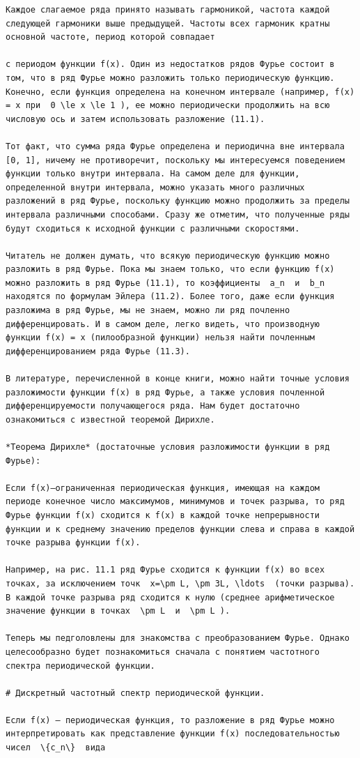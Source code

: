 \documentclass[
  ukrainian,
]{article}
\begin{document}
\begin{verbatim}
Каждое слагаемое ряда принято называть гармоникой, частота каждой следующей гармоники выше предыдущей. Частоты всех гармоник кратны основной частоте, период которой совпадает

с периодом функции f(x). Один из недостатков рядов Фурье состоит в том, что в ряд Фурье можно разложить только периодическую функцию. Конечно, если функция определена на конечном интервале (например, f(x) = x при  0 \le x \le 1 ), ее можно периодически продолжить на всю числовую ось и затем использовать разложение (11.1).

Тот факт, что сумма ряда Фурье определена и периодична вне интервала [0, 1], ничему не противоречит, поскольку мы интересуемся поведением функции только внутри интервала. На самом деле для функции, определенной внутри интервала, можно указать много различных разложений в ряд Фурье, поскольку функцию можно продолжить за пределы интервала различными способами. Сразу же отметим, что полученные ряды будут сходиться к исходной функции с различными скоростями.

Читатель не должен думать, что всякую периодическую функцию можно разложить в ряд Фурье. Пока мы знаем только, что если функцию f(x) можно разложить в ряд Фурье (11.1), то коэффициенты  a_n  и  b_n  находятся по формулам Эйлера (11.2). Более того, даже если функция разложима в ряд Фурье, мы не знаем, можно ли ряд почленно дифференцировать. И в самом деле, легко видеть, что производную функции f(x) = x (пилообразной функции) нельзя найти почленным дифференцированием ряда Фурье (11.3).

В литературе, перечисленной в конце книги, можно найти точные условия разложимости функции f(x) в ряд Фурье, а также условия почленной дифференцируемости получающегося ряда. Нам будет достаточно ознакомиться с известной теоремой Дирихле.

*Теорема Дирихле* (достаточные условия разложимости функции в ряд Фурье):

Если f(x)—ограниченная периодическая функция, имеющая на каждом периоде конечное число максимумов, минимумов и точек разрыва, то ряд Фурье функции f(x) сходится к f(x) в каждой точке непрерывности функции и к среднему значению пределов функции слева и справа в каждой точке разрыва функции f(x).

Например, на рис. 11.1 ряд Фурье сходится к функции f(x) во всех точках, за исключением точк  x=\pm L, \pm 3L, \ldots  (точки разрыва). В каждой точке разрыва ряд сходится к нулю (среднее арифметическое значение функции в точках  \pm L  и  \pm L ).

Теперь мы педголовлены для знакомства с преобразованием Фурье. Однако целесообразно будет познакомиться сначала с понятием частотного спектра периодической функции.

# Дискретный частотный спектр периодической функции.

Если f(x) — периодическая функция, то разложение в ряд Фурье можно интерпретировать как представление функции f(x) последовательностью чисел  \{c_n\}  вида
\end{verbatim}
\end{document}
